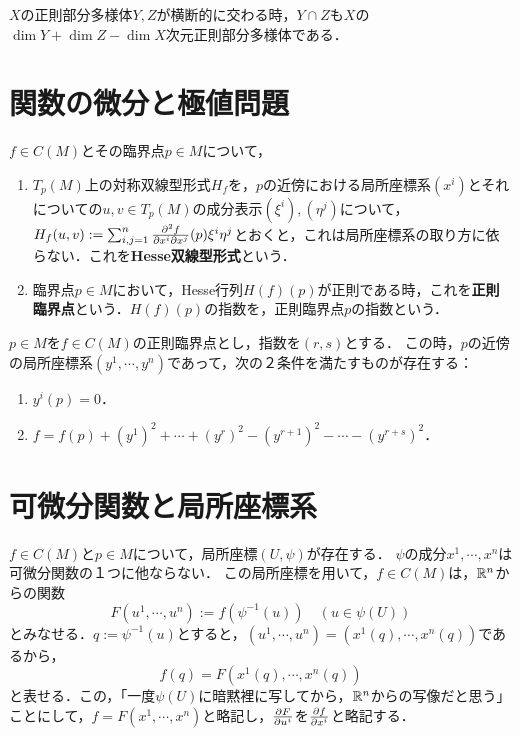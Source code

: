 \documentclass[uplatex,dvipdfmx]{jsreport}
\begin{document}
\begin{theorem}
    $X$の正則部分多様体$Y,Z$が横断的に交わる時，$Y\cap Z$も$X$の$\dim Y+\dim Z-\dim X$次元正則部分多様体である．
\end{theorem}

\section{関数の微分と極値問題}

\begin{definition}
    $f\in C(M)$とその臨界点$p\in M$について，
    \begin{enumerate}
        \item $T_p(M)$上の対称双線型形式$H_f$を，$p$の近傍における局所座標系$(x^i)$とそれについての$u,v\in T_p(M)$の成分表示$(\xi^i),(\eta^j)$について，
        $H_f(u,v):=\sum^n_{i,j=1}\frac{\partial ^2f}{\partial x^i\partial x^j}(p)\xi^i\eta^j$とおくと，これは局所座標系の取り方に依らない．これを\textbf{Hesse双線型形式}という．
        \item 臨界点$p\in M$において，Hesse行列$H(f)(p)$が正則である時，これを\textbf{正則臨界点}という．$H(f)(p)$の指数を，正則臨界点$p$の指数という．
    \end{enumerate}
\end{definition}

\begin{theorem}
    $p\in M$を$f\in C(M)$の正則臨界点とし，指数を$(r,s)$とする．
    この時，$p$の近傍の局所座標系$(y^1,\cdots,y^n)$であって，次の２条件を満たすものが存在する：
    \begin{enumerate}
        \item $y^i(p)=0$．
        \item $f=f(p)+(y^1)^2+\cdots+(y^r)^2-(y^{r+1})^2-\cdots-(y^{r+s})^2$．
    \end{enumerate}
\end{theorem}

\section{可微分関数と局所座標系}

\begin{notation}
    $f\in C(M)$と$p\in M$について，局所座標$(U,\psi)$が存在する．
    $\psi$の成分$x^1,\cdots,x^n$は可微分関数の１つに他ならない．
    この局所座標を用いて，$f\in C(M)$は，$\mathbb{R}^n$からの関数
    \[F(u^1,\cdots,u^n):=f(\psi^{-1}(u))\quad(u\in\psi(U))\]
    とみなせる．$q:=\psi^{-1}(u)$とすると，$(u^1,\cdots,u^n)=(x^1(q),\cdots,x^n(q))$であるから，
    \[f(q)=F(x^1(q),\cdots,x^n(q))\]
    と表せる．この，「一度$\psi(U)$に暗黙裡に写してから，$\mathbb{R}^n$からの写像だと思う」ことにして，$f=F(x^1,\cdots,x^n)$と略記し，$\frac{\partial F}{\partial u^i}$を$\frac{\partial f}{\partial x^i}$と略記する．
\end{notation}
\end{document}

